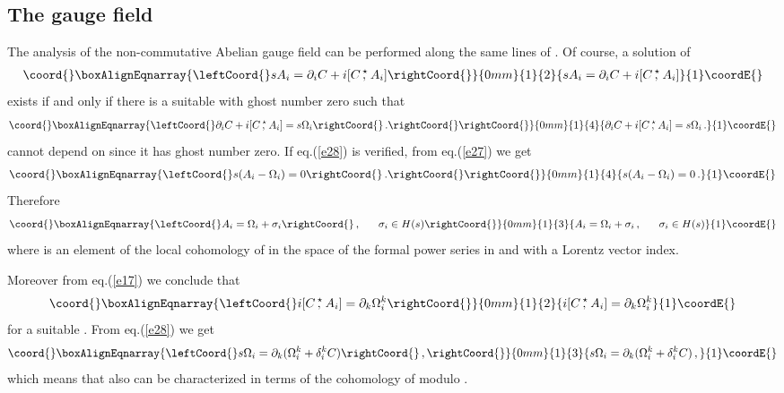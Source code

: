 \documentclass[a4paper,12pt]{article}
\providecommand{\starcomm}[2]{[ #1 \, ,^{\!\!\star} #2 ]}
\begin{document}
\subsection{The gauge field \coordHE{}}

The analysis of the non-commutative Abelian gauge field \coordHE{} can be
 performed along the same lines of \coordHE{}.
Of course, a solution of
%
\begin{eqnarray}\coord{}\boxAlignEqnarray{\leftCoord{}
s A_i = \partial_i C + i \starcomm{C}{A_i}
\label{e27}
\rightCoord{}}{0mm}{1}{2}{
s A_i = \partial_i C + i \starcomm{C}{A_i}
}{1}\coordE{}\end{eqnarray}
%
exists if and only if there is a suitable \coordHE{} with ghost number 
 zero such that
%
\begin{eqnarray}\coord{}\boxAlignEqnarray{\leftCoord{}
\partial_i C + i \starcomm{C}{A_i} = s \Omega_i \rightCoord{}\, .\rightCoord{}
\label{e28}
\rightCoord{}}{0mm}{1}{4}{
\partial_i C + i \starcomm{C}{A_i} = s \Omega_i \, .
}{1}\coordE{}\end{eqnarray}
%
\coordHE{} cannot depend on \coordHE{} since it has ghost number zero.
If eq.(\ref{e28}) is verified, from eq.(\ref{e27}) we get
%
\begin{eqnarray}\coord{}\boxAlignEqnarray{\leftCoord{}
s ( A_i - \Omega_i) = 0 \rightCoord{}\, .\rightCoord{}
\label{e29}
\rightCoord{}}{0mm}{1}{4}{
s ( A_i - \Omega_i) = 0 \, .
}{1}\coordE{}\end{eqnarray}
%
Therefore 
%
\begin{eqnarray}\coord{}\boxAlignEqnarray{\leftCoord{}
A_i = \Omega_i + \sigma_i \rightCoord{}\, , ~~~~~\sigma_i \in H(s) 
\label{e30}
\rightCoord{}}{0mm}{1}{3}{
A_i = \Omega_i + \sigma_i \, , ~~~~~\sigma_i \in H(s) 
}{1}\coordE{}\end{eqnarray}
%
where \coordHE{} is an element of the local cohomology of \coordHE{} in the space
of the formal power series in \coordHE{} and \myHighlight{$\theta$}\coordHE{} with a Lorentz vector
index.

Moreover from eq.(\ref{e17}) we conclude that
%
\begin{eqnarray}\coord{}\boxAlignEqnarray{\leftCoord{}
i \starcomm{C}{A_i} = \partial_k \Omega^k_i 
\label{e31}
\rightCoord{}}{0mm}{1}{2}{
i \starcomm{C}{A_i} = \partial_k \Omega^k_i 
}{1}\coordE{}\end{eqnarray}
%
for a suitable \coordHE{}. From eq.(\ref{e28}) we
get
%
\begin{eqnarray}\coord{}\boxAlignEqnarray{\leftCoord{}
s \Omega_i = \partial_k (\Omega^k_i + \delta^k_i C) \rightCoord{}\, ,
\label{e32}
\rightCoord{}}{0mm}{1}{3}{
s \Omega_i = \partial_k (\Omega^k_i + \delta^k_i C) \, ,
}{1}\coordE{}\end{eqnarray}
%
which means that also \coordHE{} can be characterized in terms of the
 cohomology of \coordHE{} modulo \coordHE{}.
\end{document}
